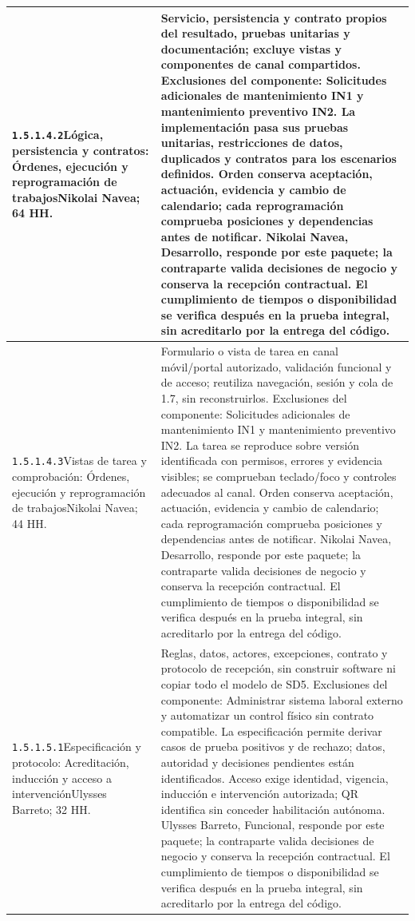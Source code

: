\begin{longtable}{L{52mm}L{91mm}}
\texttt{1.\allowbreak{}5.\allowbreak{}1.\allowbreak{}4.\allowbreak{}2}\newline Lógica, persistencia y contratos: Órdenes, ejecución y reprogramación de trabajos\newline Nikolai Navea; 64 HH. & Servicio, persistencia y contrato propios del resultado, pruebas unitarias y documentación; excluye vistas y componentes de canal compartidos. Exclusiones del componente: Solicitudes adicionales de mantenimiento IN1 y mantenimiento preventivo IN2. La implementación pasa sus pruebas unitarias, restricciones de datos, duplicados y contratos para los escenarios definidos. Orden conserva aceptación, actuación, evidencia y cambio de calendario; cada reprogramación comprueba posiciones y dependencias antes de notificar. Nikolai Navea, Desarrollo, responde por este paquete; la contraparte valida decisiones de negocio y conserva la recepción contractual. El cumplimiento de tiempos o disponibilidad se verifica después en la prueba integral, sin acreditarlo por la entrega del código.\\\hline
\texttt{1.\allowbreak{}5.\allowbreak{}1.\allowbreak{}4.\allowbreak{}3}\newline Vistas de tarea y comprobación: Órdenes, ejecución y reprogramación de trabajos\newline Nikolai Navea; 44 HH. & Formulario o vista de tarea en canal móvil/portal autorizado, validación funcional y de acceso; reutiliza navegación, sesión y cola de 1.7, sin reconstruirlos. Exclusiones del componente: Solicitudes adicionales de mantenimiento IN1 y mantenimiento preventivo IN2. La tarea se reproduce sobre versión identificada con permisos, errores y evidencia visibles; se comprueban teclado/foco y controles adecuados al canal. Orden conserva aceptación, actuación, evidencia y cambio de calendario; cada reprogramación comprueba posiciones y dependencias antes de notificar. Nikolai Navea, Desarrollo, responde por este paquete; la contraparte valida decisiones de negocio y conserva la recepción contractual. El cumplimiento de tiempos o disponibilidad se verifica después en la prueba integral, sin acreditarlo por la entrega del código.\\\hline
\texttt{1.\allowbreak{}5.\allowbreak{}1.\allowbreak{}5.\allowbreak{}1}\newline Especificación y protocolo: Acreditación, inducción y acceso a intervención\newline Ulysses Barreto; 32 HH. & Reglas, datos, actores, excepciones, contrato y protocolo de recepción, sin construir software ni copiar todo el modelo de SD5. Exclusiones del componente: Administrar sistema laboral externo y automatizar un control físico sin contrato compatible. La especificación permite derivar casos de prueba positivos y de rechazo; datos, autoridad y decisiones pendientes están identificados. Acceso exige identidad, vigencia, inducción e intervención autorizada; QR identifica sin conceder habilitación autónoma. Ulysses Barreto, Funcional, responde por este paquete; la contraparte valida decisiones de negocio y conserva la recepción contractual. El cumplimiento de tiempos o disponibilidad se verifica después en la prueba integral, sin acreditarlo por la entrega del código.\\\hline

\end{longtable}
